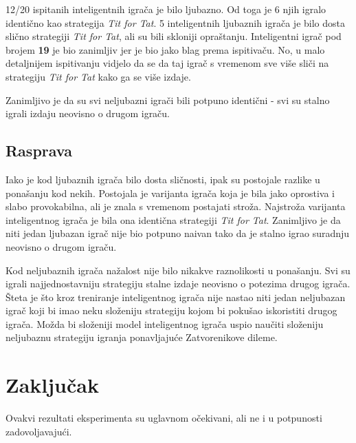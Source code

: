 \documentclass[zavrsnirad]{fer}
\begin{document}
	12/20 ispitanih inteligentnih igrača je bilo ljubazno. Od toga je 6 njih igralo identično kao strategija \textit{Tit for Tat}. 5 inteligentnih ljubaznih igrača je bilo dosta slično strategiji \textit{Tit for Tat}, ali su bili skloniji opraštanju. Inteligentni igrač pod brojem \textbf{19} je bio zanimljiv jer je bio jako blag prema ispitivaču. No, u malo detaljnijem ispitivanju vidjelo da se da taj igrač s vremenom sve više sliči na strategiju \textit{Tit for Tat} kako ga se više izdaje.
	
	Zanimljivo je da su svi neljubazni igrači bili potpuno identični - svi su stalno igrali izdaju neovisno o drugom igraču.

	\section{Rasprava}
	
		Iako je kod ljubaznih igrača bilo dosta sličnosti, ipak su postojale razlike u ponašanju kod nekih. Postojala je varijanta igrača koja je bila jako oprostiva i slabo provokabilna, ali je znala s vremenom postajati stroža. Najstroža varijanta inteligentnog igrača je bila ona identična strategiji \textit{Tit for Tat}. Zanimljivo je da niti jedan ljubazan igrač nije bio potpuno naivan tako da je stalno igrao suradnju neovisno o drugom igraču.
		
		Kod neljubaznih igrača nažalost nije bilo nikakve raznolikosti u ponašanju. Svi su igrali najjednostavniju strategiju stalne izdaje neovisno o potezima drugog igrača. Šteta je što kroz treniranje inteligentnog igrača nije nastao niti jedan neljubazan igrač koji bi imao neku složeniju strategiju kojom bi pokušao iskoristiti drugog igrača. Možda bi složeniji model inteligentnog igrača uspio naučiti složeniju neljubaznu strategiju igranja ponavljajuće Zatvorenikove dileme.
		
		



\chapter{Zaključak}
\label{pog:zakljucak}

	Ovakvi rezultati eksperimenta su uglavnom očekivani, ali ne i u potpunosti zadovoljavajući. 
	
\end{document}
